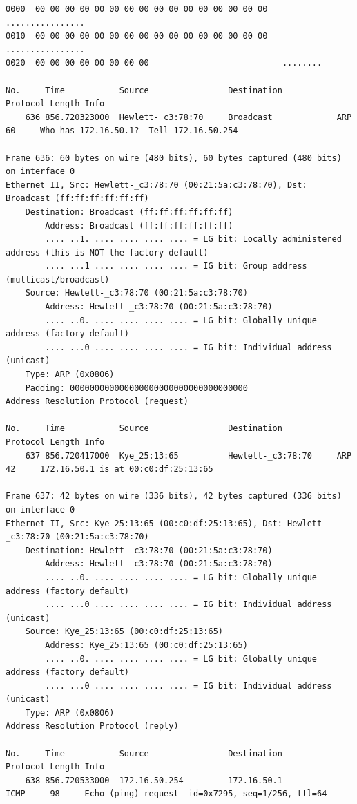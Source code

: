 \documentclass[a4paper,11pt]{article}
\begin{document}
\begin{lstlisting}
0000  00 00 00 00 00 00 00 00 00 00 00 00 00 00 00 00   ................
0010  00 00 00 00 00 00 00 00 00 00 00 00 00 00 00 00   ................
0020  00 00 00 00 00 00 00 00                           ........

No.     Time           Source                Destination           Protocol Length Info
    636 856.720323000  Hewlett-_c3:78:70     Broadcast             ARP      60     Who has 172.16.50.1?  Tell 172.16.50.254

Frame 636: 60 bytes on wire (480 bits), 60 bytes captured (480 bits) on interface 0
Ethernet II, Src: Hewlett-_c3:78:70 (00:21:5a:c3:78:70), Dst: Broadcast (ff:ff:ff:ff:ff:ff)
    Destination: Broadcast (ff:ff:ff:ff:ff:ff)
        Address: Broadcast (ff:ff:ff:ff:ff:ff)
        .... ..1. .... .... .... .... = LG bit: Locally administered address (this is NOT the factory default)
        .... ...1 .... .... .... .... = IG bit: Group address (multicast/broadcast)
    Source: Hewlett-_c3:78:70 (00:21:5a:c3:78:70)
        Address: Hewlett-_c3:78:70 (00:21:5a:c3:78:70)
        .... ..0. .... .... .... .... = LG bit: Globally unique address (factory default)
        .... ...0 .... .... .... .... = IG bit: Individual address (unicast)
    Type: ARP (0x0806)
    Padding: 000000000000000000000000000000000000
Address Resolution Protocol (request)

No.     Time           Source                Destination           Protocol Length Info
    637 856.720417000  Kye_25:13:65          Hewlett-_c3:78:70     ARP      42     172.16.50.1 is at 00:c0:df:25:13:65

Frame 637: 42 bytes on wire (336 bits), 42 bytes captured (336 bits) on interface 0
Ethernet II, Src: Kye_25:13:65 (00:c0:df:25:13:65), Dst: Hewlett-_c3:78:70 (00:21:5a:c3:78:70)
    Destination: Hewlett-_c3:78:70 (00:21:5a:c3:78:70)
        Address: Hewlett-_c3:78:70 (00:21:5a:c3:78:70)
        .... ..0. .... .... .... .... = LG bit: Globally unique address (factory default)
        .... ...0 .... .... .... .... = IG bit: Individual address (unicast)
    Source: Kye_25:13:65 (00:c0:df:25:13:65)
        Address: Kye_25:13:65 (00:c0:df:25:13:65)
        .... ..0. .... .... .... .... = LG bit: Globally unique address (factory default)
        .... ...0 .... .... .... .... = IG bit: Individual address (unicast)
    Type: ARP (0x0806)
Address Resolution Protocol (reply)

No.     Time           Source                Destination           Protocol Length Info
    638 856.720533000  172.16.50.254         172.16.50.1           ICMP     98     Echo (ping) request  id=0x7295, seq=1/256, ttl=64


\end{lstlisting}
\end{document}
